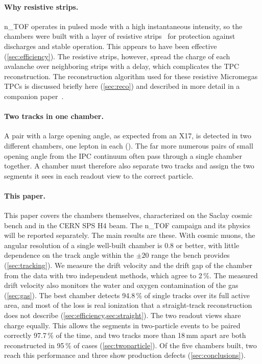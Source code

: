 \paragraph{Why resistive strips.}
n\_TOF operates in pulsed mode with a high instantaneous intensity, so the chambers were built with a layer of resistive strips~\cite{Alexopoulos2011} for protection against discharges and stable operation. This appears to have been effective
(\cref{sec:efficiency}). The resistive strips, however, spread the charge of each avalanche over neighboring strips
with a delay, which complicates the TPC reconstruction. The reconstruction algorithm used for these resistive
Micromegas TPCs is discussed briefly here (\cref{sec:reco}) and described in more detail in a companion paper~\cite{paperII}.

\paragraph{Two tracks in one chamber.}
A pair with a large opening angle, as expected from an X17, is detected in two different chambers, one lepton in each (). The far more
numerous pairs of small opening angle from the IPC continuum often pass through a single chamber together. A chamber must
therefore also separate two tracks and assign the two segments it sees in each readout view to the correct particle.

\paragraph{This paper.}
This paper covers the chambers themselves, characterized on the Saclay cosmic bench and in the CERN SPS H4 beam. The n\_TOF
campaign and its physics will be reported separately. The main results are these. With cosmic muons, the angular resolution of a single well-built chamber
is 0.8\textdegree{} or better, with little dependence on
the track angle within the $\pm20$\textdegree{} range the bench provides (\cref{sec:tracking}). We measure the drift velocity and the drift gap of the chamber from the data with two
independent methods, which agree to 2\,\%. The measured drift velocity also monitors the water and oxygen contamination of the gas (\cref{sec:gas}). The best
chamber detects 94.8\,\% of single tracks over its full active area, and most of the loss is real ionization that a straight-track reconstruction does not describe (\cref{sec:efficiency,sec:straight}). The two
readout views share charge equally. This allows the segments in two-particle events to be paired correctly 97.7\,\% of the time, and two
tracks more than 18\,mm apart are both reconstructed in 95\,\% of cases (\cref{sec:twoparticle}). Of the five chambers built, two reach this performance and three show production defects
(\cref{sec:conclusions}).

